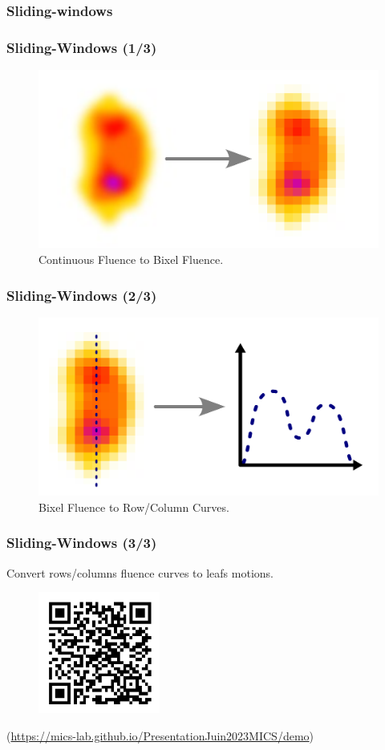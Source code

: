 \documentclass{beamer}
\begin{document}
	\subsubsection{Sliding-windows}
	\begin{frame}
		\frametitle{Sliding-Windows (1/3)}
		\begin{figure}
			\includegraphics[width=\linewidth]{vector_images/fluence_bixelization.pdf}
			\caption{Continuous Fluence to Bixel Fluence.}
		\end{figure}
	\end{frame}
	\begin{frame}
		\frametitle{Sliding-Windows (2/3)}
		\begin{figure}
			\includegraphics[width=\linewidth]{vector_images/sliding_window_curve.pdf}
			\caption{Bixel Fluence to Row/Column Curves.}
		\end{figure}
	\end{frame}
	\begin{frame}
		\frametitle{Sliding-Windows (3/3)}
		Convert rows/columns fluence curves to leafs motions.
		\begin{figure}
			\includegraphics[height=4cm]{matrix_images/demo_QR_code.png}
		\end{figure}
		{\small (\url{https://mics-lab.github.io/PresentationJuin2023MICS/demo})}
	\end{frame}
	
\end{document}
